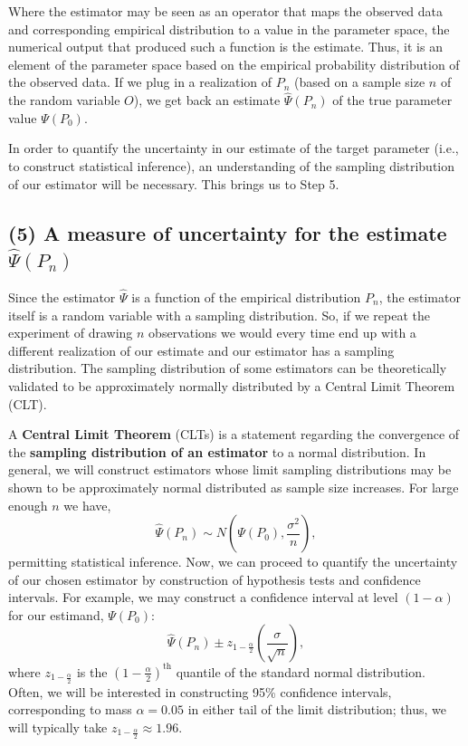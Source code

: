 \documentclass[12pt, krantz2,]{krantz}
\theoremstyle{definition}
\theoremstyle{definition}
\theoremstyle{definition}
\newcommand{\1}{\mathbbm{1}}
\begin{document}
Where the estimator may be seen as an operator that maps the observed data and
corresponding empirical distribution to a value in the parameter space, the
numerical output that produced such a function is the estimate. Thus, it is an
element of the parameter space based on the empirical probability distribution
of the observed data. If we plug in a realization of \(P_n\) (based on a sample
size \(n\) of the random variable \(O\)), we get back an estimate \(\hat{\Psi}(P_n)\)
of the true parameter value \(\Psi(P_0)\).

In order to quantify the uncertainty in our estimate of the target parameter
(i.e., to construct statistical inference), an understanding of the sampling
distribution of our estimator will be necessary. This brings us to Step 5.

\hypertarget{a-measure-of-uncertainty-for-the-estimate-hatpsip_n}{%
\subsection*{\texorpdfstring{(5) A measure of uncertainty for the estimate \(\hat{\Psi}(P_n)\)}{(5) A measure of uncertainty for the estimate \textbackslash{}hat\{\textbackslash{}Psi\}(P\_n)}}\label{a-measure-of-uncertainty-for-the-estimate-hatpsip_n}}


Since the estimator \(\hat{\Psi}\) is a function of the empirical distribution
\(P_n\), the estimator itself is a random variable with a sampling distribution.
So, if we repeat the experiment of drawing \(n\) observations we would every time
end up with a different realization of our estimate and our estimator has a
sampling distribution. The sampling distribution of some estimators can be
theoretically validated to be approximately normally distributed by a Central
Limit Theorem (CLT).

A \textbf{Central Limit Theorem} (CLTs) is a statement regarding the convergence of
the \textbf{sampling distribution of an estimator} to a normal distribution. In
general, we will construct estimators whose limit sampling distributions may be
shown to be approximately normal distributed as sample size increases. For large
enough \(n\) we have,
\begin{equation*}
  \hat{\Psi}(P_n) \sim N \left(\Psi(P_0), \frac{\sigma^2}{n}\right),
\end{equation*}
permitting statistical inference. Now, we can proceed to quantify the
uncertainty of our chosen estimator by construction of hypothesis tests and
confidence intervals. For example, we may construct a confidence interval at
level \((1 - \alpha)\) for our estimand, \(\Psi(P_0)\):
\begin{equation*}
  \hat{\Psi}(P_n) \pm z_{1 - \frac{\alpha}{2}}
    \left(\frac{\sigma}{\sqrt{n}}\right),
\end{equation*}
where \(z_{1 - \frac{\alpha}{2}}\) is the \((1 - \frac{\alpha}{2})^\text{th}\)
quantile of the standard normal distribution. Often, we will be interested in
constructing 95\% confidence intervals, corresponding to mass \(\alpha = 0.05\) in
either tail of the limit distribution; thus, we will typically take
\(z_{1 - \frac{\alpha}{2}} \approx 1.96\).
\end{document}
